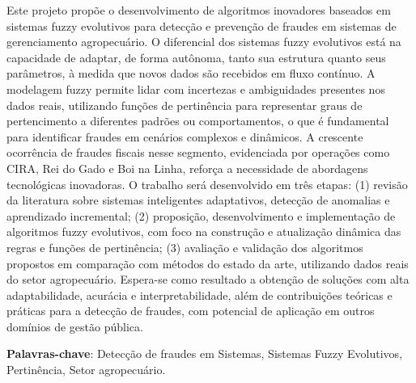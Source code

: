 \label{chap:resumo}


\begin{resumo}

Este projeto propõe o desenvolvimento de algoritmos inovadores baseados em sistemas fuzzy evolutivos para detecção e prevenção de fraudes em sistemas de gerenciamento agropecuário. O diferencial dos sistemas fuzzy evolutivos está na capacidade de adaptar, de forma autônoma, tanto sua estrutura quanto seus parâmetros, à medida que novos dados são recebidos em fluxo contínuo. A modelagem fuzzy permite lidar com incertezas e ambiguidades presentes nos dados reais, utilizando funções de pertinência para representar graus de pertencimento a diferentes padrões ou comportamentos, o que é fundamental para identificar fraudes em cenários complexos e dinâmicos. A crescente ocorrência de fraudes fiscais nesse segmento, evidenciada por operações como CIRA, Rei do Gado e Boi na Linha, reforça a necessidade de abordagens tecnológicas inovadoras. O trabalho será desenvolvido em três etapas: (1) revisão da literatura sobre sistemas inteligentes adaptativos, detecção de anomalias e aprendizado incremental; (2) proposição, desenvolvimento e implementação de algoritmos fuzzy evolutivos, com foco na construção e atualização dinâmica das regras e funções de pertinência; (3) avaliação e validação dos algoritmos propostos em comparação com métodos do estado da arte, utilizando dados reais do setor agropecuário. Espera-se como resultado a obtenção de soluções com alta adaptabilidade, acurácia e interpretabilidade, além de contribuições teóricas e práticas para a detecção de fraudes, com potencial de aplicação em outros domínios de gestão pública.
 
 \vspace{0.5cm}
 
\textbf{Palavras-chave}: Detecção de fraudes em Sistemas, Sistemas Fuzzy Evolutivos, Pertinência, Setor agropecuário.

\end{resumo}
